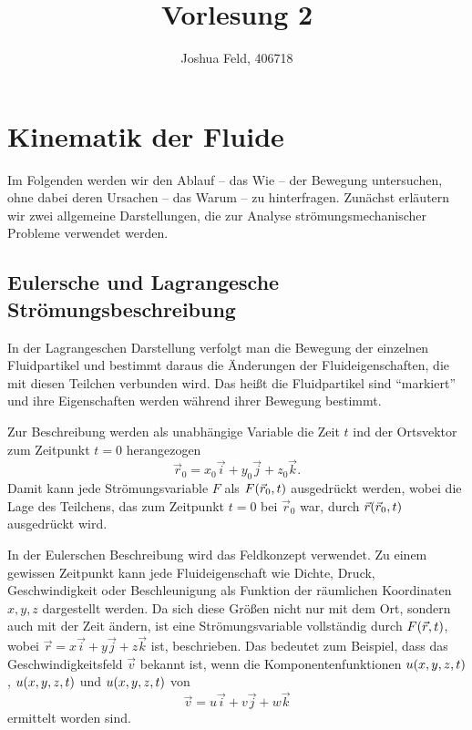 \documentclass{lecture}
\institute{Lehrstuhl für Strömungslehre und Aerodynamisches Institut}
\title{Vorlesung 2}
\author{Joshua Feld, 406718}
\begin{document}
    \maketitle


    \section*{Kinematik der Fluide}

    Im Folgenden werden wir den Ablauf -- das Wie -- der Bewegung untersuchen, ohne dabei deren Ursachen -- das Warum -- zu hinterfragen.
    Zunächst erläutern wir zwei allgemeine Darstellungen, die zur Analyse strömungsmechanischer Probleme verwendet werden.


    \subsection*{Eulersche und Lagrangesche Strömungsbeschreibung}

    In der Lagrangeschen Darstellung verfolgt man die Bewegung der einzelnen Fluidpartikel und bestimmt daraus die Änderungen der Fluideigenschaften, die mit diesen Teilchen verbunden wird.
    Das heißt die Fluidpartikel sind ``markiert'' und ihre Eigenschaften werden während ihrer Bewegung bestimmt.

    Zur Beschreibung werden als unabhängige Variable die Zeit \(t\) ind der Ortsvektor zum Zeitpunkt \(t = 0\) herangezogen
    \[
        \vec{r}_0 = x_0 \vec{i} + y_0 \vec{j} + z_0 \vec{k}.
    \]
    Damit kann jede Strömungsvariable \(F\) als \(F\parentheses*{\vec{r}_0, t}\) ausgedrückt werden, wobei die Lage des Teilchens, das zum Zeitpunkt \(t = 0\) bei \(\vec{r}_0\) war, durch \(\vec{r}\parentheses*{\vec{r}_0, t}\) ausgedrückt wird.

    In der Eulerschen Beschreibung wird das Feldkonzept verwendet. Zu einem gewissen Zeitpunkt kann jede Fluideigenschaft wie Dichte, Druck, Geschwindigkeit oder Beschleunigung als Funktion der räumlichen Koordinaten \(x, y, z\) dargestellt werden.
    Da sich diese Größen nicht nur mit dem Ort, sondern auch mit der Zeit ändern, ist eine Strömungsvariable vollständig durch \(F\parentheses*{\vec{r}, t}\), wobei \(\vec{r} = x\vec{i} + y\vec{j} + z\vec{k}\) ist, beschrieben.
    Das bedeutet zum Beispiel, dass das Geschwindigkeitsfeld \(\vec{v}\) bekannt ist, wenn die Komponentenfunktionen \(u\parentheses*{x, y, z, t}\), \(u\parentheses*{x, y, z, t}\) und \(u\parentheses*{x, y, z, t}\) von
    \[
        \vec{v} = u\vec{i} + v\vec{j} + w\vec{k}
    \]
    ermittelt worden sind.
\end{document}
